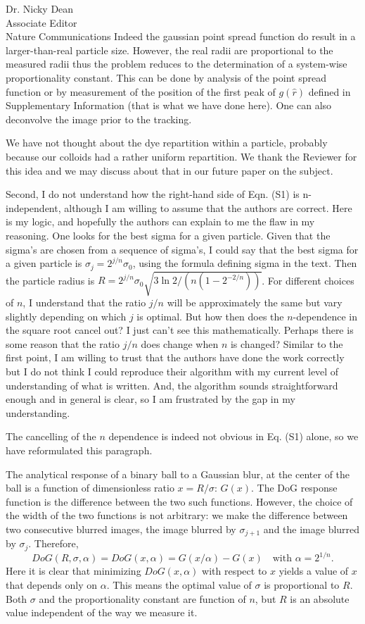 \documentclass[a4paper, rebuttal, parskip=true, firsthead=false, fromemail=true, foldmarks=false]{scrlttr2}
\begin{document}
\begin{letter}{Dr. Nicky Dean\\
Associate Editor\\
Nature Communications}
Indeed the gaussian point spread function do result in a larger-than-real particle size. However, the real radii are proportional to the measured radii thus the problem reduces to the determination of a system-wise proportionality constant. This can be done by analysis of the point spread function or by measurement of the position of the first peak of $g(\hat{r})$ defined in Supplementary Information (that is what we have done here). One can also deconvolve the image prior to the tracking.

We have not thought about the dye repartition within a particle, probably because our colloids had a rather uniform repartition. We thank the Reviewer for this idea and we may discuss about that in our future paper on the subject.

\begin{quotationi}
Second, I do not understand how the right-hand side of Eqn. (S1) is n-independent, although I am willing to assume that the authors are correct. Here is my logic, and hopefully the authors can explain to me the flaw in my reasoning. One looks for the best sigma for a given particle. Given that the sigma's are chosen from a sequence of sigma's, I could say that the best sigma for a given particle is $\sigma_j = 2^{j/n} \sigma_0$, using the formula defining sigma in the text. Then the particle radius is $R = 2^{j/n} \sigma_0 \sqrt{3 \ln 2 / (n (1-2^{-2/n}))}$. For different choices of $n$, I understand that the ratio $j/n$ will be approximately the same but vary slightly depending on which $j$ is optimal. But how then does the $n$-dependence in the square root cancel out? I just can't see this mathematically. Perhaps there is some reason that the ratio $j/n$ does change when $n$ is changed? Similar to the first point, I am willing to trust that the authors have done the work correctly but I do not think I could reproduce their algorithm with my current level of understanding of what is written. And, the algorithm sounds straightforward enough and in general is clear, so I am frustrated by the gap in my understanding.
\end{quotationi}

The cancelling of the $n$ dependence is indeed not obvious in Eq. (S1) alone, so we have reformulated this paragraph.


The analytical response of a binary ball to a Gaussian blur, at the center of the ball is a function of dimensionless ratio $x=R/\sigma$: $G(x)$. The DoG response function is the difference between the two such functions. However, the choice of the width of the two functions is not arbitrary: we make the difference between two consecutive blurred images, the image blurred by $\sigma_{j+1}$ and the image blurred by $\sigma_j$. Therefore, 
\[
DoG(R,\sigma, \alpha) = DoG(x, \alpha) = G(x/\alpha) - G(x) \quad\text{with }\alpha=2^{1/n}.
\]
Here it is clear that minimizing $DoG(x, \alpha)$ with respect to $x$ yields a value of $x$ that depends only on $\alpha$. This means the optimal value of $\sigma$ is proportional to $R$.  Both $\sigma$ and the proportionality constant are function of $n$, but $R$ is an absolute value independent of the way we measure it.


\end{letter}
\end{document}
